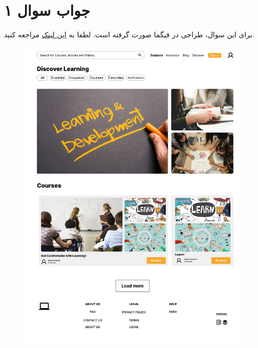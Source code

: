 \section*{جواب سوال ۱}

برای این سوال، طراحی در فیگما صورت گرفته است. لطفا به \href{https://www.figma.com/file/j9DWRQmEEL1pcwmt5AWs4E/HW3?type=design&node-id=0%3A1&mode=design&t=lIFq8iezIYotDbWQ-1}
{این لینک} مراجعه کنید.


\begin{figure}[H]
	\centering
	\includegraphics{Frame 1.png}
	
	\label{fig:label4}
\end{figure}

\newpage

